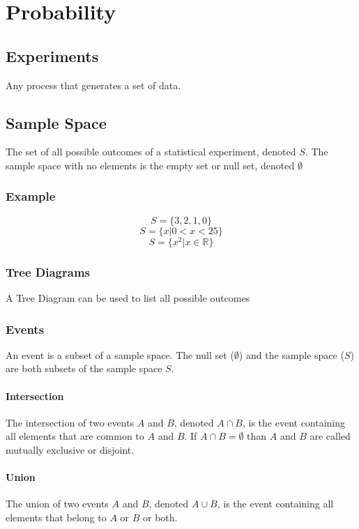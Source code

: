 \documentclass{book}
\begin{document}
\chapter{Probability}

\section{Experiments}
Any process that generates a set of data.

\section{Sample Space}
The set of all possible outcomes of a statistical experiment, denoted $S$. The sample space with no elements is the empty set or null set, denoted $\emptyset$

\subsection{Example}

$$S = \{ 3, 2, 1, 0\}$$
$$S = \{ x | 0 < x < 25 \}$$
$$S= \{ x^2 | x \in \mathbb{R}\}$$

\subsection{Tree Diagrams}
A Tree Diagram can be used to list all possible outcomes

\subsection{Events}
An event is a subset of a sample space. The null set ($\emptyset$) and the sample space ($S$) are both subsets of the sample space $S$.

\subsubsection{Intersection}
The intersection of two events $A$ and $B$, denoted $A \cap B$, is the event containing all elements that are common to $A$ and $B$. If $A \cap B = \emptyset$ than $A$ and $B$ are called mutually exclusive or disjoint.

\subsubsection{Union}
The union of two events $A$ and $B$, denoted $A \cup B$, is the event containing all elements that belong to $A$ or $B$ or both.
\end{document}

